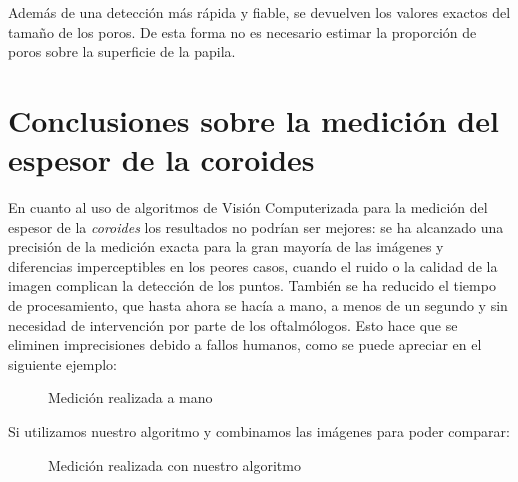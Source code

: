 Además de una detección más rápida y fiable, se devuelven los valores exactos del
tamaño de los poros. De esta forma no es necesario estimar la proporción de poros
sobre la superficie de la papila.

\section{Conclusiones sobre la medición del espesor de la coroides}
En cuanto al uso de algoritmos de Visión Computerizada para la 
medición del espesor de la \emph{coroides} los resultados no
podrían ser mejores: se ha alcanzado una precisión de la medición
exacta para la gran mayoría de las imágenes y diferencias 
imperceptibles en los peores casos, cuando el ruido o la calidad
de la imagen complican la detección de los puntos. También se
ha reducido el tiempo de procesamiento, que hasta ahora se hacía
a mano, a menos de un segundo y sin necesidad de intervención
por parte de los oftalmólogos. Esto hace que se eliminen imprecisiones
debido a fallos humanos, como se puede apreciar en el siguiente ejemplo:

    \begin{figure}[H]
      \caption{Medición realizada a mano}
      \centering \setlength\fboxsep{0pt} \setlength\fboxrule{0.5pt}
    \end{figure}

Si utilizamos nuestro algoritmo y combinamos las imágenes para poder
comparar:

    \begin{figure}[H]
      \caption{Medición realizada con nuestro algoritmo}
      \centering \setlength\fboxsep{0pt} \setlength\fboxrule{0.5pt}
    \end{figure}

